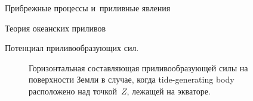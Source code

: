 \begin{chapter}{Прибрежные процессы и~приливные явления}
\begin{section}{Теория океанских приливов}
\begin{paragraph}{Потенциал приливообразующих сил.}
\begin{figure}[t!]
\caption{Горизонтальная составляющая приливообразующей силы на поверхности
Земли в случае, когда tide-generating body расположено над точкой~$Z$,
лежащей на экваторе.~\cite[стр.~413]{Dietrich:1980}}
\label{fig:horiztideforce}
\end{figure}
%
%


\end{paragraph}
\end{section}
\end{chapter}

